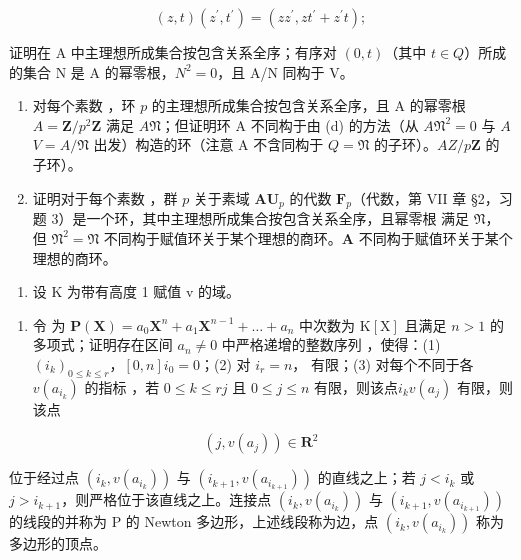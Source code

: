\[
(z, t) (z ^ {\prime}, t ^ {\prime}) = (z z ^ {\prime}, z t ^ {\prime} + z ^ {\prime} t);
\]

证明在 A 中主理想所成集合按包含关系全序；有序对 \((0, t)\)（其中 \(t \in Q\)）所成的集合 N 是 A 的幂零根，\(N^{2} = 0\)，且 A/N 同构于 V。

\begin{enumerate}
\def\labelenumi{(\alph{enumi})}
\setcounter{enumi}{4}
\item
  对每个素数 ，环 \(p\) 的主理想所成集合按包含关系全序，且 A 的幂零根 \(A = \mathbf{Z} / p^2\mathbf{Z}\) 满足 \(A\)\(\mathfrak{N}\)；但证明环 A 不同构于由 (d) 的方法（从 \(A\)\(\mathfrak{N}^2 = 0\) 与 \(A\)\(V = A / \mathfrak{N}\) 出发）构造的环（注意 A 不含同构于 \(Q = \mathfrak{N}\) 的子环）。\(A\)\(Z / p\mathbf{Z}\) 的子环）。
\item
  证明对于每个素数 ，群 \(p\) 关于素域 \(\mathbf{A}\)\(\mathbf{U}_p\) 的代数 \(\mathbf{F}_p\)（代数，第 VII 章 §2，习题 3）是一个环，其中主理想所成集合按包含关系全序，且幂零根  满足 \(\mathfrak{N}\)，但 \(\mathfrak{N}^2 = \mathfrak{N}\) 不同构于赋值环关于某个理想的商环。\(\mathbf{A}\) 不同构于赋值环关于某个理想的商环。
\end{enumerate}

\begin{enumerate}
\def\labelenumi{\arabic{enumi}.}
\setcounter{enumi}{10}
\tightlist
\item
  设 K 为带有高度 1 赋值 v 的域。
\end{enumerate}

\begin{enumerate}
\def\labelenumi{(\alph{enumi})}
\tightlist
\item
  令  为 \(\mathbf{P}(\mathbf{X}) = a_0\mathbf{X}^n +a_1\mathbf{X}^{n - 1} + \dots +a_n\) 中次数为 \(\mathrm{K[X]}\) 且满足 \(n > 1\) 的多项式；证明存在区间 \(a_{n} \neq 0\) 中严格递增的整数序列 ，使得：(1) \((i_{k})_{0 \leqslant k \leqslant r}\)，\([0, n]\)\(i_{0} = 0\)；(2) 对 \(i_{r} = n\)， 有限；(3) 对每个不同于各 \(v(a_{i_{k}})\) 的指标 ，若 \(0 \leqslant k \leqslant r\)\(j\) 且 \(0 \leqslant j \leqslant n\) 有限，则该点\(i_{k}\)\(v(a_{j})\) 有限，则该点
\end{enumerate}

\[
(j, v (a _ {j})) \in \mathbf {R} ^ {2}
\]

位于经过点 \((i_{k}, v(a_{i_{k}}))\) 与 \((i_{k+1}, v(a_{i_{k+1}}))\) 的直线之上；若 \(j < i_{k}\) 或 \(j > i_{k+1}\)，则严格位于该直线之上。连接点 \((i_{k}, v(a_{i_{k}}))\) 与 \((i_{k+1}, v(a_{i_{k+1}}))\) 的线段的并称为 P 的 Newton 多边形，上述线段称为边，点 \((i_{k}, v(a_{i_{k}}))\) 称为多边形的顶点。

